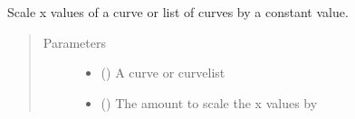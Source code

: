 \documentclass[letterpaper,10pt,english]{sphinxmanual}
\begin{document}
\begin{fulllineitems}
\label{\detokenize{pydv:pydvpy.mx}}
Scale x values of a curve or list of curves by a constant value.

\begin{sphinxVerbatim}[commandchars=\\\{\}]
  
\end{sphinxVerbatim}

\begin{sphinxVerbatim}[commandchars=\\\{\}]
  
\end{sphinxVerbatim}

\begin{sphinxVerbatim}[commandchars=\\\{\}]
\PYG{p}{[}\PYG{p}{]} 
\end{sphinxVerbatim}
\begin{quote}\begin{description}
\item[{Parameters}] \leavevmode\begin{itemize}
\item {} 
 ({\hyperref[\detokenize{pydv:curve.Curve}]{}}) \textendash{} A curve or curvelist

\item {} 
 () \textendash{} The amount to scale the x values by

\end{itemize}

\end{description}\end{quote}

\end{fulllineitems}
\end{document}
